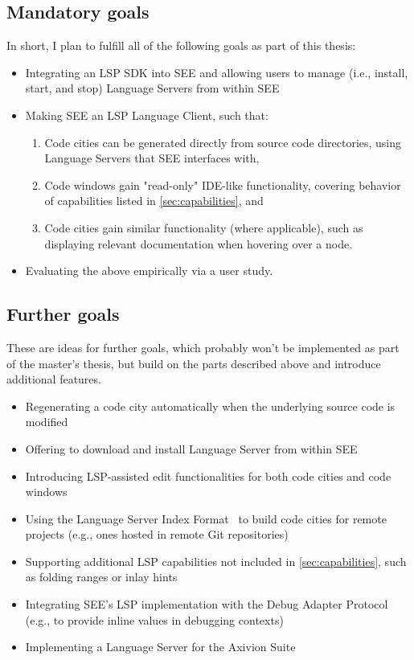 \documentclass{scrartcl}
\newcommand{\SEE}{\textsc{SEE}}
\begin{document}
{\subsection{Mandatory goals}
In short, I plan to fulfill all of the following goals as part of this thesis:
\begin{itemize}
  \item Integrating an LSP SDK into \SEE{} and allowing users to manage (i.e., install, start, and stop) Language Servers from within SEE
  \item Making \SEE{} an LSP Language Client, such that:
    \begin{enumerate}
      \item Code cities can be generated directly from source code directories, using Language Servers that \SEE{} interfaces with,
      \item Code windows gain "read-only" IDE-like functionality, covering behavior of capabilities listed in \autoref{sec:capabilities}, and
      \item Code cities gain similar functionality (where applicable), such as displaying relevant documentation when hovering over a node.
    \end{enumerate}
  \item Evaluating the above empirically via a user study.
\end{itemize}

\subsection{Further goals}
These are ideas for further goals, which probably won't be implemented as part of the master's thesis, but build on the parts described above and introduce additional features.
\begin{itemize}
  \item Regenerating a code city automatically when the underlying source code is modified
  \item Offering to download and install Language Server from within \SEE{}
  \item Introducing LSP-assisted edit functionalities for both code cities and code windows
  \item Using the Language Server Index Format~\cite{lsif} to build code cities for remote projects (e.g., ones hosted in remote Git repositories)
  \item Supporting additional LSP capabilities not included in \autoref{sec:capabilities}, such as folding ranges or inlay hints
  \item Integrating \SEE{}'s LSP implementation with the Debug Adapter Protocol~\cite{dap} (e.g., to provide inline values in debugging contexts)
  \item Implementing a Language Server for the Axivion Suite
\end{itemize}

}
\end{document}
